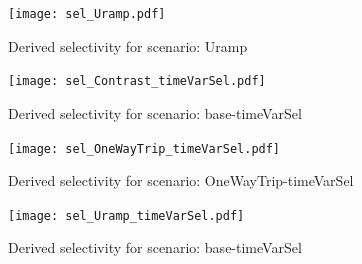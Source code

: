 \documentclass{fancyslides}
\begin{document}



\begin{frame}
\begin{center} %
\begin{figure}               
                \texttt{[image: sel\_Uramp.pdf]}  
               \caption{Derived selectivity for scenario: Uramp}
\end{figure}
\end{center}
\end{frame}








\begin{frame}
\begin{center} %
\begin{figure}               
                \texttt{[image: sel\_Contrast\_timeVarSel.pdf]}  
		\caption{Derived selectivity for scenario: base-timeVarSel}
\end{figure}
\end{center}
\end{frame}







\begin{frame}
\begin{center} %
\begin{figure}               
                \texttt{[image: sel\_OneWayTrip\_timeVarSel.pdf]}  
		\caption{Derived selectivity for scenario: OneWayTrip-timeVarSel}
\end{figure}
\end{center}
\end{frame}





\begin{frame}
\begin{center} %
\begin{figure}               
                \texttt{[image: sel\_Uramp\_timeVarSel.pdf]}  
		\caption{Derived selectivity for scenario: base-timeVarSel}
\end{figure}
\end{center}
\end{frame}

\end{document}
